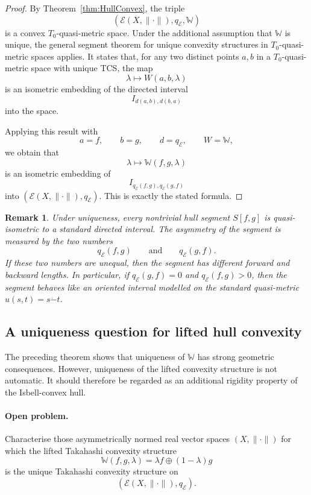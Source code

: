 \documentclass[preprint,12pt]{elsarticle}
\numberwithin{equation}{section}
\newtheorem{remark}[theorem]{Remark}
\newcommand{\E}{\mathcal{E}}
\begin{document}
\begin{proof}
By Theorem~\ref{thm:HullConvex}, the triple
\[
(\E(X,\|\cdot\|),q_{\E},\mathbb W)
\]
is a convex \(T_0\)-quasi-metric space.  Under the additional assumption that
\(\mathbb W\) is unique, the general segment theorem for unique convexity
structures in \(T_0\)-quasi-metric spaces applies.  It states that, for any
two distinct points \(a,b\) in a \(T_0\)-quasi-metric space with unique TCS,
the map
\[
\lambda\longmapsto W(a,b,\lambda)
\]
is an isometric embedding of the directed interval
\[
I_{d(a,b),d(b,a)}
\]
into the space.

Applying this result with
\[
a=f,\qquad b=g,\qquad d=q_{\E},\qquad W=\mathbb W,
\]
we obtain that
\[
\lambda\longmapsto \mathbb W(f,g,\lambda)
\]
is an isometric embedding of
\[
I_{q_{\E}(f,g),q_{\E}(g,f)}
\]
into \((\E(X,\|\cdot\|),q_{\E})\).  This is exactly the stated formula.
\end{proof}

\begin{remark}\label{rem:segmentIsom-consequences}
Under uniqueness, every nontrivial hull segment \(S[f,g]\) is quasi-isometric
to a standard directed interval.  The asymmetry of the segment is measured by
the two numbers
\[
q_{\E}(f,g)
\qquad\text{and}\qquad
q_{\E}(g,f).
\]
If these two numbers are unequal, then the segment has different forward and
backward lengths.  In particular, if \(q_{\E}(g,f)=0\) and \(q_{\E}(f,g)>0\),
then the segment behaves like an oriented interval modelled on the standard
quasi-metric \(u(s,t)=s\dot{-}t\).
\end{remark}

\subsection{A uniqueness question for lifted hull convexity}

The preceding theorem shows that uniqueness of \(\mathbb W\) has strong
geometric consequences.  However, uniqueness of the lifted convexity structure
is not automatic.  It should therefore be regarded as an additional rigidity
property of the Isbell-convex hull.

\paragraph{Open problem.}
Characterise those asymmetrically normed real vector spaces
\((X,\|\cdot\|)\) for which the lifted Takahashi convexity structure
\[
\mathbb W(f,g,\lambda)=\lambda f\oplus(1-\lambda)g
\]
is the unique Takahashi convexity structure on
\[
(\E(X,\|\cdot\|),q_{\E}).
\]
\end{document}
